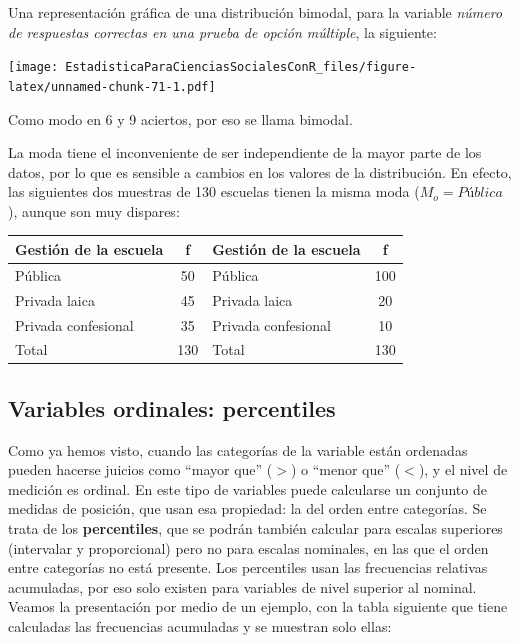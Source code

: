 \documentclass[]{book}
\begin{document}
Una representación gráfica de una distribución bimodal, para la variable \emph{número de respuestas correctas en una prueba de opción múltiple}, la siguiente:

\texttt{[image: EstadisticaParaCienciasSocialesConR\_files/figure-latex/unnamed-chunk-71-1.pdf]}

Como modo en 6 y 9 aciertos, por eso se llama bimodal.

La moda tiene el inconveniente de ser independiente de la mayor parte de los datos, por lo que es sensible a cambios en los valores de la
distribución. En efecto, las siguientes dos muestras de 130 escuelas
tienen la misma moda (\(M_o = Pública\)), aunque son muy dispares:

\begin{longtable}[]{@{}lclc@{}}
\toprule
Gestión de la escuela & f & Gestión de la escuela & f\tabularnewline
\midrule
\endhead
Pública & 50 & Pública & 100\tabularnewline
Privada laica & 45 & Privada laica & 20\tabularnewline
Privada confesional & 35 & Privada confesional & 10\tabularnewline
Total & 130 & Total & 130\tabularnewline
\bottomrule
\end{longtable}

\hypertarget{variables-ordinales-percentiles}{%
\subsection{Variables ordinales: percentiles}\label{variables-ordinales-percentiles}}

Como ya hemos visto, cuando las categorías de la variable están
ordenadas pueden hacerse juicios como ``mayor que'' (\(>\)) o ``menor que''
(\(<\)), y el nivel de medición es ordinal. En este tipo de variables
puede calcularse un conjunto de medidas de posición, que usan esa propiedad: la del orden entre categorías. Se trata de los \textbf{percentiles}, que se podrán también calcular para escalas superiores (intervalar y proporcional) pero no para escalas nominales, en las que el orden entre categorías no está presente.
Los percentiles usan las frecuencias relativas acumuladas, por eso solo existen para variables de nivel superior al nominal. Veamos la presentación por medio de un ejemplo, con la tabla siguiente que tiene calculadas las frecuencias acumuladas y se muestran solo ellas:
\end{document}
